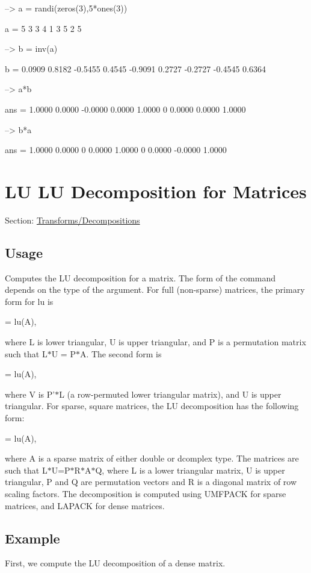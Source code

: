 \begin{DoxyVerbInclude}
--> a = randi(zeros(3),5*ones(3))

a = 
 5 3 3 
 4 1 3 
 5 2 5 

--> b = inv(a)

b = 
    0.0909    0.8182   -0.5455 
    0.4545   -0.9091    0.2727 
   -0.2727   -0.4545    0.6364 

--> a*b

ans = 
    1.0000    0.0000   -0.0000 
    0.0000    1.0000         0 
    0.0000    0.0000    1.0000 

--> b*a

ans = 
    1.0000    0.0000         0 
    0.0000    1.0000         0 
    0.0000   -0.0000    1.0000 
\end{DoxyVerbInclude}
 \hypertarget{transforms_lu}{}\section{L\-U L\-U Decomposition for Matrices}\label{transforms_lu}
Section\-: \hyperlink{sec_transforms}{Transforms/\-Decompositions} \hypertarget{vtkwidgets_vtkxyplotwidget_Usage}{}\subsection{Usage}\label{vtkwidgets_vtkxyplotwidget_Usage}
Computes the L\-U decomposition for a matrix. The form of the command depends on the type of the argument. For full (non-\/sparse) matrices, the primary form for {\ttfamily lu} is \begin{DoxyVerb}   [L,U,P] = lu(A),
\end{DoxyVerb}
 where {\ttfamily L} is lower triangular, {\ttfamily U} is upper triangular, and {\ttfamily P} is a permutation matrix such that {\ttfamily L$\ast$\-U = P$\ast$\-A}. The second form is \begin{DoxyVerb}   [V,U] = lu(A),
\end{DoxyVerb}
 where {\ttfamily V} is {\ttfamily P'$\ast$\-L} (a row-\/permuted lower triangular matrix), and {\ttfamily U} is upper triangular. For sparse, square matrices, the L\-U decomposition has the following form\-: \begin{DoxyVerb}   [L,U,P,Q,R] = lu(A),
\end{DoxyVerb}
 where {\ttfamily A} is a sparse matrix of either {\ttfamily double} or {\ttfamily dcomplex} type. The matrices are such that {\ttfamily L$\ast$\-U=P$\ast$\-R$\ast$\-A$\ast$\-Q}, where {\ttfamily L} is a lower triangular matrix, {\ttfamily U} is upper triangular, {\ttfamily P} and {\ttfamily Q} are permutation vectors and {\ttfamily R} is a diagonal matrix of row scaling factors. The decomposition is computed using U\-M\-F\-P\-A\-C\-K for sparse matrices, and L\-A\-P\-A\-C\-K for dense matrices. \hypertarget{variables_struct_Example}{}\subsection{Example}\label{variables_struct_Example}
First, we compute the L\-U decomposition of a dense matrix.


